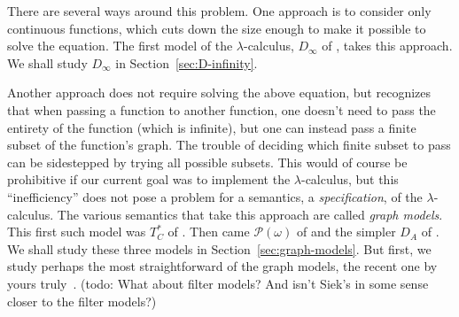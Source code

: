 \documentclass{tufte-handout}
\begin{document}
There are several ways around this problem. One approach is to
consider only continuous functions, which cuts down the size enough to
make it possible to solve the equation. The first model of the
$\lambda$-calculus, $D_\infty$ of \citet{Scott:1970dp}, takes this
approach. We shall study $D_\infty$ in Section~\ref{sec:D-infinity}.

Another approach does not require solving the above equation, but
recognizes that when passing a function to another function, one
doesn't need to pass the entirety of the function (which is infinite),
but one can instead pass a finite subset of the function's graph.  The
trouble of deciding which finite subset to pass can be sidestepped by
trying all possible subsets. This would of course be prohibitive if
our current goal was to implement the $\lambda$-calculus, but this
``inefficiency'' does not pose a problem for a semantics, a
\emph{specification}, of the $\lambda$-calculus. The various semantics
that take this approach are called \emph{graph models}. This first
such model was $T^{*}_C$ of \citet{Plotkin:1972aa}. Then came
$\mathcal{P}(\omega)$ of \citet{Scott:1976lq} and the simpler $D_A$ of
\citet{Engeler:1981aa}. We shall study these three models in
Section~\ref{sec:graph-models}. But first, we study perhaps the most
straightforward of the graph models, the recent one by yours
truly~\citep{Siek:2017ab}. (todo: What about filter models? And isn't
Siek's in some sense closer to the filter models?)
\end{document}
